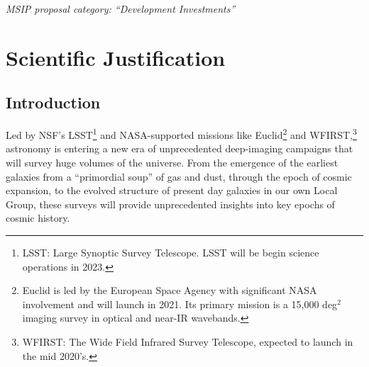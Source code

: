 \documentclass[oneside,11pt]{amsart}
\begin{document}



\setcounter{page}{1}

\centerline{{\it MSIP proposal category: ``Development Investments''}}

\section{Scientific Justification} 

\subsection{Introduction}

Led by NSF's LSST\footnote{
%
LSST: Large Synoptic Survey Telescope. LSST will be begin science
operations in 2023.} and NASA-supported missions like
Euclid\footnote{
%
Euclid is led by the European Space Agency with significant NASA
involvement and will launch in 2021. Its primary mission is a 15,000
deg$^2$ imaging survey in optical and near-IR wavebands.} and
WFIRST,\footnote{
%
WFIRST: The Wide Field Infrared Survey Telescope, expected to launch
in the mid 2020's.} astronomy is entering a new era of unprecedented
deep-imaging campaigns that will survey huge volumes of the universe.
From the emergence of the earliest galaxies from a ``primordial
soup'' of gas and dust, through the epoch of cosmic expansion, to the
evolved structure of present day galaxies in our own Local Group,
these surveys will provide unprecedented insights into key epochs of
cosmic history.
\end{document}
